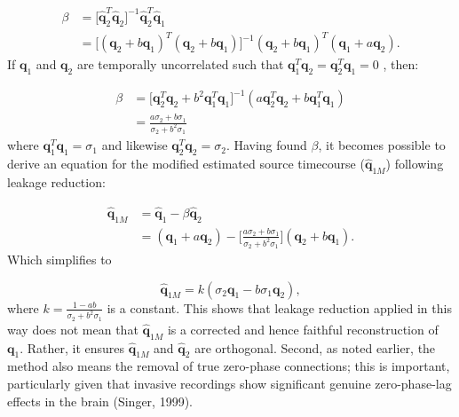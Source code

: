 \begin{equation}
\begin{aligned}
\beta &= \big[\hat{\mathbf{q}}_2^T\hat{\mathbf{q}}_2\big]^{-1}\hat{\mathbf{q}}_2^T\hat{\mathbf{q}}_1\\
&=\big[(\mathbf{q}_2+b\mathbf{q}_1)^T(\mathbf{q}_2+b\mathbf{q}_1)\big]^{-1}(\mathbf{q}_2+b\mathbf{q}_1)^T(\mathbf{q}_1+a\mathbf{q}_2).
\end{aligned}
\end{equation} If $\mathbf{q}_1$ and $\mathbf{q}_2$ are temporally uncorrelated such that $\mathbf{q}_1^T\mathbf{q}_2 = \mathbf{q}_2^T\mathbf{q}_1 = 0$ , then:

\begin{equation}
\begin{aligned}
\beta &= \big[\mathbf{q}_2^T\mathbf{q}_2+b^2\mathbf{q}_1^T\mathbf{q}_1\big]^{-1}(a\mathbf{q}_2^T\mathbf{q}_2+b\mathbf{q}_1^T\mathbf{q}_1)\\
&=\frac{a\sigma_2+b\sigma_1}{\sigma_2+b^2\sigma_1}
\end{aligned}
\end{equation} where $\mathbf{q}_1^T\mathbf{q}_1 = \sigma_1$ and likewise $\mathbf{q}_2^T\mathbf{q}_2 = \sigma_2$. Having found $\beta$, it becomes possible to derive an equation for the modified estimated source timecourse ($\hat{\mathbf{q}}_{1M}$) following leakage reduction:

\begin{equation}
\begin{aligned}
\hat{\mathbf{q}}_{1M} &= \hat{\mathbf{q}}_{1} - \beta\hat{\mathbf{q}}_{2}\\
&= (\mathbf{q}_{1} + a\mathbf{q}_{2})-\Bigg[\frac{a\sigma_2+b\sigma_1}{\sigma_2+b^2\sigma_1}\Bigg](\mathbf{q}_{2} + b\mathbf{q}_{1}).
\end{aligned}
\label{eqn_dyn_leak_0}
\end{equation}Which simplifies to

\begin{equation}
\hat{\mathbf{q}}_{1M} = k(\sigma_2\mathbf{q}_1 - b\sigma_1\mathbf{q}_2),
\end{equation} where $k = \frac{1-ab}{\sigma_2+b^2\sigma_1}$ is a constant. This shows that leakage reduction applied in this way does not mean that $\hat{\mathbf{q}}_{1M}$ is a corrected and hence faithful reconstruction of $\mathbf{q}_1$. Rather, it ensures $\hat{\mathbf{q}}_{1M}$ and $\hat{\mathbf{q}}_{2}$ are orthogonal. Second, as noted earlier, the method also means the removal of true zero-phase connections; this is important, particularly given that invasive recordings show significant genuine zero-phase-lag effects in the brain (Singer, 1999). 

